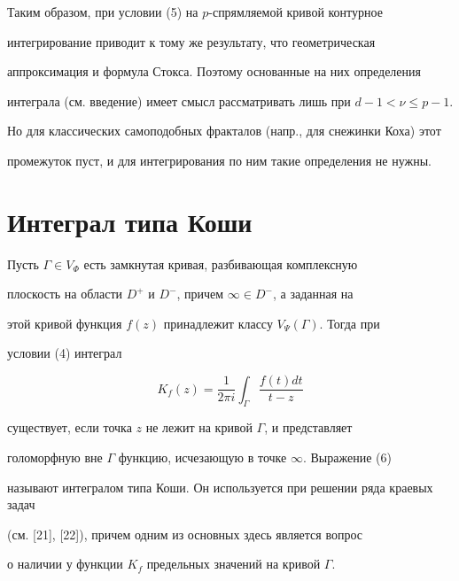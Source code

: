 Таким образом, при условии (5) на $p$-спрямляемой кривой контурное


интегрирование приводит к тому же результату, что геометрическая


аппроксимация и формула Стокса. Поэтому основанные на них определения


интеграла (см. введение) имеет смысл рассматривать лишь при $d-1<\nu \le p-1$.


Но для классических самоподобных фракталов (напр., для снежинки Коха) этот


промежуток пуст, и для интегрирования по ним такие определения не нужны.





\section{Интеграл типа Коши}





Пусть $\Gamma\in V_\Phi$ есть замкнутая кривая, разбивающая комплексную


плоскость на области $D^+$ и $D^-$, причем $\infty\in D^-$, а заданная на


этой кривой функция $f(z)$ принадлежит классу $V_{\Psi}(\Gamma)$. Тогда при


условии (4) интеграл


\begin{equation}


K_{f}(z) = \frac{1}{2\pi i}\int_{\Gamma}{\frac{f(t)dt}{t-z}}


\end{equation}


существует, если точка $z$ не лежит на кривой $\Gamma$, и представляет


голоморфную вне $\Gamma$ функцию, исчезающую в точке $\infty$. Выражение (6)


называют интегралом типа Коши. Он используется при решении ряда краевых задач


(см. [21], [22]), причем одним из основных здесь является вопрос


о наличии у функции $K_f$ предельных значений на кривой $\Gamma$.





